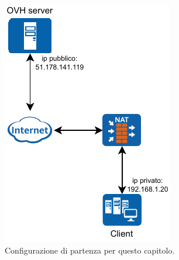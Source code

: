 \begin{figure}[h]

    \centering

    \begin{subfigure}{0.5\textwidth}
        \centering
        \includegraphics[height=1.2\linewidth]{immagini/diag-simple_ips}
        \caption{Configurazione di partenza per questo capitolo.}
        \label{fig:diag-simple_ips}
    \end{subfigure}%
    \hfill
    \begin{subfigure}{0.5\textwidth}
        \centering

\end{subfigure}
\end{figure}

